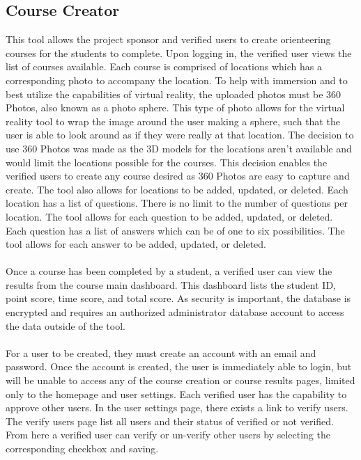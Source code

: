 \subsection{Course Creator}
This tool allows the project sponsor and verified users to create orienteering courses for the students to complete. Upon logging in, the verified user views the list of courses available. Each course is comprised of locations which has a corresponding photo to accompany the location. To help with immersion and to best utilize the capabilities of virtual reality, the uploaded photos must be 360 Photos, also known as a photo sphere. This type of photo allows for the virtual reality tool to wrap the image around the user making a sphere, such that the user is able to look around as if they were really at that location. The decision to use 360 Photos was made as the 3D models for the locations aren't available and would limit the locations possible for the courses. This decision enables the verified users to create any course desired as 360 Photos are easy to capture and create. The tool also allows for locations to be added, updated, or deleted. Each location has a list of questions. There is no limit to the number of questions per location. The tool allows for each question to be added, updated, or deleted. Each question has a list of answers which can be of one to six possibilities. The tool allows for each answer to be added, updated, or deleted. \\
\\
Once a course has been completed by a student, a verified user can view the results from the course main dashboard. This dashboard lists the student ID, point score, time score, and total score. As security is important, the database is encrypted and requires an authorized administrator database account to access the data outside of the tool. \\
\\
For a user to be created, they must create an account with an email and password. Once the account is created, the user is immediately able to login, but will be unable to access any of the course creation or course results pages, limited only to the homepage and user settings. Each verified user has the capability to approve other users. In the user settings page, there exists a link to verify users. The verify users page list all users and their status of verified or not verified. From here a verified user can verify or un-verify other users by selecting the corresponding checkbox and saving. 


